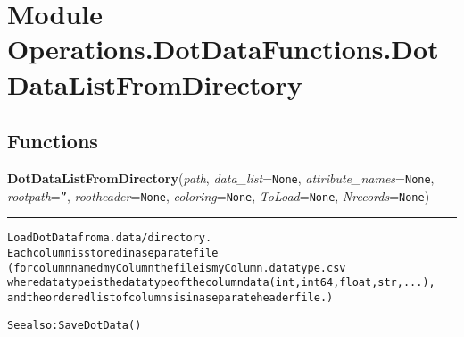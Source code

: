 %
%
%


\section{Module Operations.DotDataFunctions.DotDataListFromDirectory}

    \label{Operations:DotDataFunctions:DotDataListFromDirectory}


  \subsection{Functions}

    \label{Operations:DotDataFunctions:DotDataListFromDirectory:DotDataListFromDirectory}

    \vspace{0.5ex}

\hspace{.8\funcindent}\begin{boxedminipage}{\funcwidth}

    \raggedright \textbf{DotDataListFromDirectory}(\textit{path}, \textit{data\_list}={\tt None}, \textit{attribute\_names}={\tt None}, \textit{rootpath}={\tt ''}, \textit{rootheader}={\tt None}, \textit{coloring}={\tt None}, \textit{ToLoad}={\tt None}, \textit{Nrecords}={\tt None})

    \vspace{-1.5ex}

    \rule{\textwidth}{0.5\fboxrule}
\setlength{\parskip}{2ex}
\begin{alltt}
Load DotData from a .data/ directory.  
Each column is stored in a separate file 
        (for column named myColumn the file is myColumn.datatype.csv
        where datatype is the data type of the column data ( int, int64, float, str, ... ), 
        and the ordered list of columns is in a separate header file.)

See also: SaveDotData()
\end{alltt}

\setlength{\parskip}{1ex}
    \end{boxedminipage}

